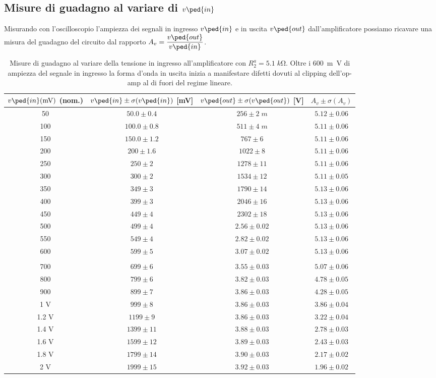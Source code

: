 \documentclass[10pt,a4paper]{article}
\begin{document}
\subsection{Misure di guadagno al variare di $v\ped{in}$}
Misurando con l'oscilloscopio l'ampiezza dei segnali in ingresso $v\ped{in}$
e in uscita $v\ped{out}$ dall'amplificatore possiamo ricavare una misura del
guadagno del circuito dal rapporto $A_v = \dfrac{v\ped{out}}{v\ped{in}}$.
\begin{table}[htbp]
\centering
\begin{tabular}{cccc}
\toprule
$v\ped{in}(\si{m\V})$ (nom.) & $v\ped{in} \pm \sigma(v\ped{in})$ [mV] & $v\ped{out} \pm \sigma(v\ped{out})$ [V] & $A_v \pm \sigma(A_v)$ \\
\midrule
\midrule
50 & $50.0 \pm 0.4$ & $256 \pm 2 \; \si{m}$ & $5.12 \pm 0.06$ \\
100 & $100.0 \pm 0.8$ & $511 \pm 4 \; \si{m}$ & $5.11 \pm 0.06$ \\
150 & $150.0 \pm 1.2$ & $767 \pm 6$ & $5.11 \pm 0.06$ \\
200 & $200 \pm 1.6$ & $1022 \pm 8$ & $5.11 \pm 0.06$ \\
250 & $250 \pm 2$ & $1278 \pm 11$ & $5.11 \pm 0.06$ \\
300 & $300 \pm 2$ & $1534 \pm 12$ & $5.11 \pm 0.05$ \\
350 & $349 \pm 3$ & $1790 \pm 14$ & $5.13 \pm 0.06$ \\
400 & $399 \pm 3$ & $2046 \pm 16$ & $5.13 \pm 0.06$ \\
450 & $449 \pm 4$ & $2302 \pm 18$ & $5.13 \pm 0.06$ \\
500 & $499 \pm 4$ & $2.56 \pm 0.02$ & $5.13 \pm 0.06$ \\
550 & $549 \pm 4$ & $2.82 \pm 0.02$ & $5.13 \pm 0.06$ \\
600 & $599 \pm 5$ & $3.07 \pm 0.02$ & $5.13 \pm 0.06$ \\
\\
700 & $699 \pm 6$ & $3.55 \pm 0.03$ & $5.07 \pm 0.06$ \\
800 & $799 \pm 6$ & $3.82 \pm 0.03$ & $4.78 \pm 0.05$ \\
900 & $899 \pm 7$ & $3.86 \pm 0.03$ & $4.28 \pm 0.05$ \\
1 V & $999 \pm 8$ & $3.86 \pm 0.03$ & $3.86 \pm 0.04$ \\
1.2 V & $1199 \pm 9$ & $3.86 \pm 0.03$ & $3.22 \pm 0.04$ \\
1.4 V & $1399 \pm 11$ & $3.88 \pm 0.03$ & $2.78 \pm 0.03$ \\
1.6 V & $1599 \pm 12$ & $3.89 \pm 0.03$ & $2.43 \pm 0.03$ \\
1.8 V & $1799 \pm 14$ & $3.90 \pm 0.03$ & $2.17 \pm 0.02$ \\
2 V & $1999 \pm 15$ & $3.92 \pm 0.03$ & $1.96 \pm 0.02$ \\
\bottomrule
\end{tabular} 
\caption{Misure di guadagno al variare della tensione in ingresso
all'amplificatore con $R_2^a = 5.1 \; \si{k\ohm}$. Oltre i \SI{600}{m\V} di
ampiezza del segnale in ingresso la forma d'onda in uscita inizia a
manifestare difetti dovuti al clipping dell'op-amp al di fuori del regime
lineare. \label{tab: gain_B}}
\end{table}
\end{document}
